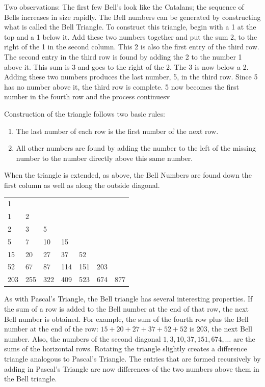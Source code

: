 \documentclass[10pt,]{book}
\theoremstyle{plain}
\theoremstyle{definition}
\theoremstyle{definition}
\theoremstyle{definition}
\theoremstyle{definition}
\numberwithin{equation}{chapter}
\begin{document}
\hypertarget{p-1132}{}%
Two observations: The first few Bell's look like the Catalans; the sequence of Bells increases in size rapidly. The Bell numbers can be generated by constructing what is called the Bell Triangle. To construct this triangle, begin with a 1 at the top and a 1 below it. Add these two numbers together and put the sum 2, to the right of the 1 in the second column. This 2 is also the first entry of the third row. The second entry in the third row is found by adding the 2 to the number 1 above it. This sum is 3 and goes to the right of the 2. The 3 is now below a 2. Adding these two numbers produces the last number, 5, in the third row. Since 5 has no number above it, the third row is complete. 5 now becomes the first number in the fourth row and the process continuesv%
\par
\hypertarget{p-1133}{}%
Construction of the triangle follows two basic rules: \leavevmode%
\begin{enumerate}
\item\hypertarget{li-228}{}\hypertarget{p-1134}{}%
The last number of each row is the first number of the next row.%
\item\hypertarget{li-229}{}\hypertarget{p-1135}{}%
All other numbers are found by adding the number to the left of the missing number to the number directly above this same number.%
\end{enumerate}
 When the triangle is extended, as above, the Bell Numbers are found down the first column as well as along the outside diagonal.%
\begin{sidebyside}{1}{0.15}{0.15}{0}
\begin{sbspanel}{0.7}
{\centering%
\begin{tabular}{lllllll}
1&&&&&&\tabularnewline[0pt]
1&2&&&&&\tabularnewline[0pt]
2&3&5&&&&\tabularnewline[0pt]
5&7&10&15&&&\tabularnewline[0pt]
15&20&27&37&52&&\tabularnewline[0pt]
52&67&87&114&151&203&\tabularnewline[0pt]
203&255&322&409&523&674&877
\end{tabular}
\par}
\end{sbspanel}
\end{sidebyside}
\par
\hypertarget{p-1136}{}%
As with Pascal's Triangle, the Bell triangle has several interesting properties. If the sum of a row is added to the Bell number at the end of that row, the next Bell number is obtained. For example, the sum of the fourth row plus the Bell number at the end of the row: \(15 + 20 + 27 + 37 + 52 + 52\) is 203, the next Bell number. Also, the numbers of the second diagonal \(1, 3, 10, 37, 151, 674, \ldots\) are the sums of the horizontal rows. Rotating the triangle slightly creates a difference triangle analogous to Pascal's Triangle. The entries that are formed recursively by adding in Pascal's Triangle are now differences of the two numbers above them in the Bell triangle.%
\end{document}

